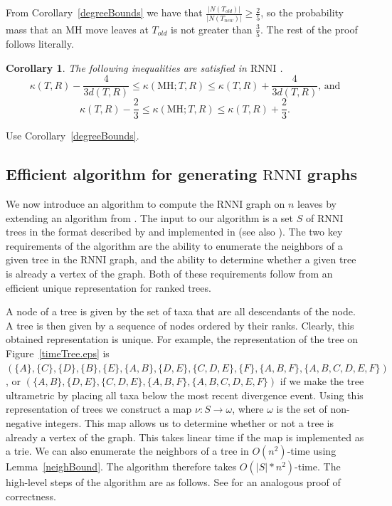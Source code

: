 \documentclass[11pt]{amsart}
\newtheorem{corollary}[lemma]{Corollary}
\theoremstyle{definition}
\newcommand{\rnni}{\mathrm{RNNI}}
\newcommand{\MH}{\mathrm{MH}}
\begin{document}
{\proof
From Corollary~\ref{degreeBounds} we have that $\frac{|N(T_{old})|}{|N(T_{new})|} \geq \frac{2}{5}$, so the probability mass that an MH move leaves at $T_{old}$ is not greater than $\frac35$.
The rest of the proof follows \autocite[][Proof of Lemma~V.8]{Whidden2015-es} literally.
\endproof

\begin{corollary}
The following inequalities are satisfied in $\rnni$ .
\[
\kappa(T,R) - \dfrac{4}{3d(T,R)} \leq \kappa(\MH;T,R) \leq \kappa(T,R) +
\dfrac{4}{3d(T,R)}\mbox{, and}
\]
\[
\kappa(T,R) - \dfrac23 \leq \kappa(\MH;T,R) \leq \kappa(T,R) + \dfrac23.
\]
\end{corollary}

\proof
Use Corollary~\ref{degreeBounds}.
\endproof
}{}


\subsection{Efficient algorithm for generating $\rnni$ graphs}

We now introduce an algorithm to compute the $\rnni$ graph on $n$ leaves by extending an algorithm from \autocite{Whidden2015-es}.
The input to our algorithm is a set $S$ of $\rnni$ trees in the format described by \textcite{Gavryushkin2014-bw} and implemented in \autocite{tauGeodesic} (see also \autocite{Semple2003-nj}).
The two key requirements of the algorithm are the ability to enumerate the neighbors of a given tree in the $\rnni$ graph, and the ability to determine whether a given tree is already a vertex of the graph.
Both of these requirements follow from an efficient unique representation for ranked trees.

A node of a tree is given by the set of taxa that are all descendants of the node.
A tree is then given by a sequence of nodes ordered by their ranks.
Clearly, this obtained representation is unique.
For example, the representation of the tree on Figure~\ref{timeTree.eps} is $(\{A\}, \{C\}, \{D\}, \{B\}, \{E\}, \{A,B\}, \{D,E\}, \{C, D, E\}, \{F\}, \{A,B,F\}, \{A,B,C,D,E,F\})$, or
$(\{A,B\}, \{D,E\}, \{C, D, E\}, \{A,B,F\}, \{A,B,C,D,E,F\})$ if we make the tree ultrametric by placing all taxa below the most recent divergence event.
Using this representation of trees we construct a map $\nu : S \to \omega$, where $\omega$ is the set of non-negative integers.
This map allows us to determine whether or not a tree is already a vertex of the graph.
This takes linear time if the map is implemented as a trie.
We can also enumerate the neighbors of a tree in $O(n^2)$-time using Lemma~\ref{neighBound}.
The algorithm therefore takes $O(|S|*n^2)$-time.
The high-level steps of the algorithm are as follows.
See \autocite{Whidden2015-es} for an analogous proof of correctness.
\end{document}
